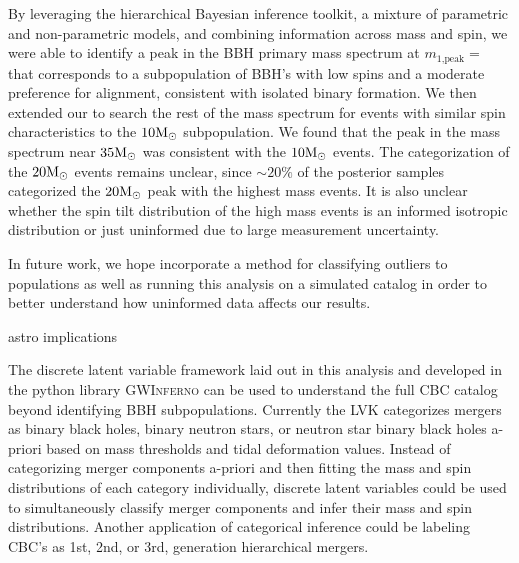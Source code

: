 By leveraging the hierarchical Bayesian inference toolkit, a mixture of parametric and non-parametric models, and combining information across mass and spin, we were able to identify a peak in the BBH primary mass spectrum at $m_\text{1,peak} = $ \result{$\CIPlusMinus{\macros[Mass][Base][PeakA][max]}$} that corresponds to a subpopulation of BBH's with low spins and a moderate preference for alignment, consistent with isolated binary formation. We then extended our \base{} to search the rest of the mass spectrum for events with similar spin characteristics to the $10{\rm M}_\odot$ subpopulation. We found that the peak in the mass spectrum near $35{\rm M}_\odot$ was consistent with the $10{\rm M}_\odot$ events. The categorization of the $20{\rm M}_\odot$ events remains unclear, since $\sim20\%$ of the posterior samples categorized the $20{\rm M}_\odot$ peak with the highest mass events. It is also unclear whether the spin tilt distribution of the high mass events is an informed isotropic distribution or just uninformed due to large measurement uncertainty. 

In future work, we hope incorporate a method for classifying outliers to populations as well as running this analysis on a simulated catalog in order to better understand how uninformed data affects our results. 

astro implications

The discrete latent variable framework laid out in this analysis and developed in the python library \textsc{GWInferno} can be used to understand the full CBC catalog beyond identifying BBH subpopulations. Currently the LVK categorizes mergers as binary black holes, binary neutron stars, or neutron star binary black holes a-priori based on mass thresholds and tidal deformation values. Instead of categorizing merger components a-priori and then fitting the mass and spin distributions of each category individually, discrete latent variables could be used to simultaneously classify merger components and infer their mass and spin distributions. Another application of categorical inference could be labeling CBC's as 1st, 2nd, or 3rd, generation hierarchical mergers. 
